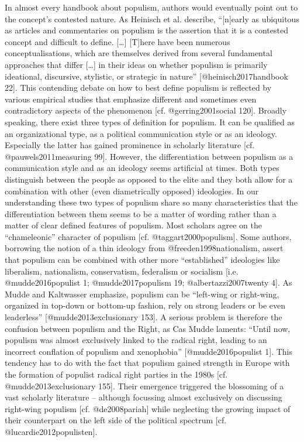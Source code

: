\documentclass[]{article}
\begin{document}
In almost every handbook about populism, authors would eventually point
out to the concept's contested nature. As Heinisch et al. describe,
``{[}n{]}early as ubiquitous as articles and commentaries on populism is
the assertion that it is a contested concept and difficult to define.
{[}\ldots{}{]} {[}T{]}here have been numerous conceptualisations, which
are themselves derived from several fundamental approaches that differ
{[}\ldots{}{]} in their ideas on whether populism is primarily
ideational, discursive, stylistic, or strategic in nature''
{[}@heinisch2017handbook 22{]}. This contending debate on how to best
define populism is reflected by various empirical studies that emphasize
different and sometimes even contradictory aspects of the phenomenon
{[}cf. @gerring2001social 120{]}. Broadly speaking, there exist three
types of definition for populism. It can be qualified as an
organizational type, as a political communication style or as an
ideology. Especially the latter has gained prominence in scholarly
literature {[}cf. @pauwels2011measuring 99{]}. However, the
differentiation between populism as a communication style and as an
ideology seems artificial at times. Both types distinguish between the
people as opposed to the elite and they both allow for a combination
with other (even diametrically opposed) ideologies. In our understanding
these two types of populism share so many characteristics that the
differentiation between them seems to be a matter of wording rather than
a matter of clear defined features of populism. Most scholars agree on
the ``chameleonic'' character of populism {[}cf.
@taggart2000populism{]}. Some authors, borrowing the notion of a thin
ideology from @freeden1998nationalism, assert that populism can be
combined with other more ``established'' ideologies like liberalism,
nationalism, conservatism, federalism or socialism {[}i.e.
@mudde2016populist 1; @mudde2017populism 19; @albertazzi2007twenty 4{]}.
As Mudde and Kaltwasser emphasize, populism can be ``left-wing or
right-wing, organized in top-down or bottom-up fashion, rely on strong
leaders or be even leaderless'' {[}@mudde2013exclusionary 153{]}. A
serious problem is therefore the confusion between populism and the
Right, as Cas Mudde laments: ``Until now, populism was almost
exclusively linked to the radical right, leading to an incorrect
conflation of populism and xenophobia'' {[}@mudde2016populist 1{]}. This
tendency has to do with the fact that populism gained strength in Europe
with the formation of populist radical right parties in the 1980s {[}cf.
@mudde2013exclusionary 155{]}. Their emergence triggered the blossoming
of a vast scholarly literature -- although focussing almost exclusively
on discussing right-wing populism {[}cf. @de2008pariah{]} while
neglecting the growing impact of their counterpart on the left side of
the political spectrum {[}cf. @lucardie2012populisten{]}.
\end{document}
